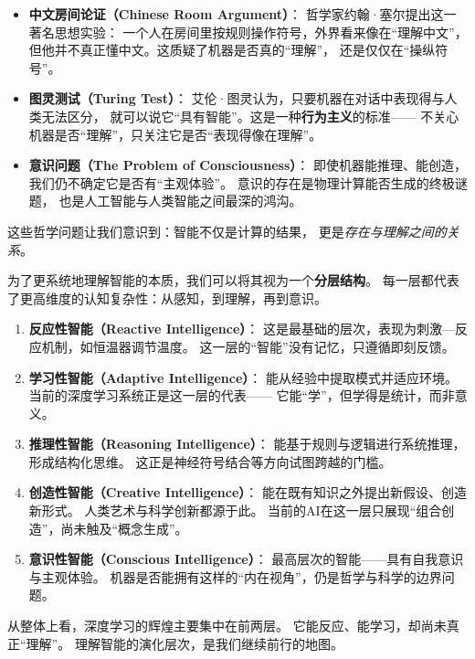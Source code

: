 \begin{itemize}
\item \textbf{中文房间论证（Chinese Room Argument）}：  
  哲学家约翰·塞尔提出这一著名思想实验：  
  一个人在房间里按规则操作符号，外界看来像在“理解中文”，  
  但他并不真正懂中文。这质疑了机器是否真的“理解”，  
  还是仅仅在“操纵符号”。  

\item \textbf{图灵测试（Turing Test）}：  
  艾伦·图灵认为，只要机器在对话中表现得与人类无法区分，  
  就可以说它“具有智能”。这是一种\textbf{行为主义}的标准——  
  不关心机器是否“理解”，只关注它是否“表现得像在理解”。  

\item \textbf{意识问题（The Problem of Consciousness）}：  
  即使机器能推理、能创造，我们仍不确定它是否有“主观体验”。  
  意识的存在是物理计算能否生成的终极谜题，  
  也是人工智能与人类智能之间最深的鸿沟。  
\end{itemize}
这些哲学问题让我们意识到：智能不仅是计算的结果，  
更是\textit{存在与理解之间的关系}。

为了更系统地理解智能的本质，我们可以将其视为一个\textbf{分层结构}。  
每一层都代表了更高维度的认知复杂性：从感知，到理解，再到意识。

\begin{enumerate}
\item \textbf{反应性智能（Reactive Intelligence）}：  
  这是最基础的层次，表现为刺激—反应机制，如恒温器调节温度。  
  这一层的“智能”没有记忆，只遵循即刻反馈。  

\item \textbf{学习性智能（Adaptive Intelligence）}：  
  能从经验中提取模式并适应环境。  
  当前的深度学习系统正是这一层的代表——  
  它能“学”，但学得是统计，而非意义。  

\item \textbf{推理性智能（Reasoning Intelligence）}：  
  能基于规则与逻辑进行系统推理，形成结构化思维。  
  这正是神经符号结合等方向试图跨越的门槛。  

\item \textbf{创造性智能（Creative Intelligence）}：  
  能在既有知识之外提出新假设、创造新形式。  
  人类艺术与科学创新都源于此。  
  当前的AI在这一层只展现“组合创造”，尚未触及“概念生成”。  

\item \textbf{意识性智能（Conscious Intelligence）}：  
  最高层次的智能——具有自我意识与主观体验。  
  机器是否能拥有这样的“内在视角”，仍是哲学与科学的边界问题。  
\end{enumerate}
从整体上看，深度学习的辉煌主要集中在前两层。  
它能反应、能学习，却尚未真正“理解”。  
理解智能的演化层次，是我们继续前行的地图。

